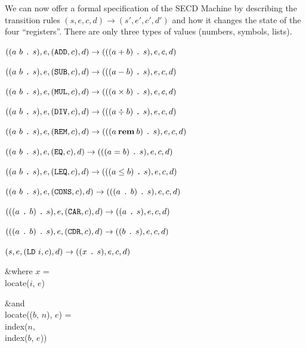\fi

\enspace\ignorespaces%
We can now offer a formal specification of the SECD Machine by
describing the transition rules $(s,e,c,d)\to(s',e',c',d')$ and how it
changes the state of the four ``registers''. There are only three
types of values (numbers, symbols, lists).

\bull
$((a~b~\hbox{\tt .\spacefactor1000}~s), e, (\hbox{\tt ADD}, c), d)\to(((a+b)~%
\hbox{\tt .\spacefactor1000}~s), e, c, d)$

\bull
$((a~b~\hbox{\tt .\spacefactor1000}~s), e, (\hbox{\tt SUB}, c), d)\to(((a-b)~%
\hbox{\tt .\spacefactor1000}~s), e, c, d)$

\bull
$((a~b~\hbox{\tt .\spacefactor1000}~s), e, (\hbox{\tt MUL}, c), d)\to(((a\times
b)~\hbox{\tt .\spacefactor1000}~s), e, c, d)$

\bull
$((a~b~\hbox{\tt .\spacefactor1000}~s), e, (\hbox{\tt DIV}, c), d)\to(((a\div
b)~\hbox{\tt .\spacefactor1000}~s), e, c, d)$

\bull
$((a~b~\hbox{\tt .\spacefactor1000}~s), e, (\hbox{\tt REM}, c), d)\to(((a%
\mathbin{\bf rem} b)~\hbox{\tt .\spacefactor1000}~s), e, c, d)$

\bull
$((a~b~\hbox{\tt .\spacefactor1000}~s), e, (\hbox{\tt EQ}, c), d)\to(((a=b)~%
\hbox{\tt .\spacefactor1000}~s), e, c, d)$

\bull
$((a~b~\hbox{\tt .\spacefactor1000}~s), e, (\hbox{\tt LEQ}, c), d)\to(((a\leq
b)~\hbox{\tt .\spacefactor1000}~s), e, c, d)$

\bull
$((a~b~\hbox{\tt .\spacefactor1000}~s), e, (\hbox{\tt CONS}, c), d)\to(((a~%
\hbox{\tt .\spacefactor1000}~b)~\hbox{\tt .\spacefactor1000}~s), e, c, d)$

\bull
$(((a~\hbox{\tt .\spacefactor1000}~b)~\hbox{\tt .\spacefactor1000}~s), e, (%
\hbox{\tt CAR}, c), d)\to((a~\hbox{\tt .\spacefactor1000}~s), e, c, d)$

\bull
$(((a~\hbox{\tt .\spacefactor1000}~b)~\hbox{\tt .\spacefactor1000}~s), e, (%
\hbox{\tt CDR}, c), d)\to((b~\hbox{\tt .\spacefactor1000}~s), e, c, d)$

\bull
$(s,e,({\tt LD}~i,c),d)\to((x~\hbox{\tt .\spacefactor1000}~s),e,c,d)$

\&{where} $x$ = \\{locate}($i$, $e$)

\&{and} \\{locate}(($b$, $n$), $e$) = \\{index}($n$, \\{index}($b$, $e$))

